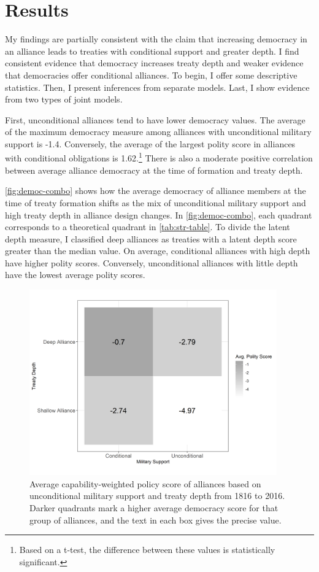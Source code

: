 \documentclass[12pt]{article}
\begin{document}
\section{Results}


My findings are partially consistent with the claim that increasing democracy in an alliance leads to treaties with conditional support and greater depth. 
I find consistent evidence that democracy increases treaty depth and weaker evidence that democracies offer conditional alliances. 
To begin, I offer some descriptive statistics.
Then, I present inferences from separate models. 
Last, I show evidence from two types of joint models. 


First, unconditional alliances tend to have lower democracy values. 
The average of the maximum democracy measure among alliances with unconditional military support is -1.4. 
Conversely, the average of the largest polity score in alliances with conditional obligations is 1.62.\footnote{Based on a t-test, the difference between these values is statistically significant.} 
There is also a moderate positive correlation between average alliance democracy at the time of formation and treaty depth. 


\autoref{fig:democ-combo} shows how the average democracy of alliance members at the time of treaty formation shifts as the mix of unconditional military support and high treaty depth in alliance design changes.
In \autoref{fig:democ-combo}, each quadrant corresponds to a theoretical quadrant in \autoref{tab:str-table}.
To divide the latent depth measure, I classified deep alliances as treaties with a latent depth score greater than the median value. 
On average, conditional alliances with high depth have higher polity scores. 
Conversely, unconditional alliances with little depth have the lowest average polity scores. 


\begin{figure}[hbtp]
\centering
\includegraphics[width=0.95\textwidth]{../figures/democ-combo.png}
\caption{Average capability-weighted policy score of alliances based on unconditional military support and treaty depth from 1816 to 2016. Darker quadrants mark a higher average democracy score for that group of alliances, and the text in each box gives the precise value. }
\label{fig:democ-combo}
\end{figure}
\end{document}
